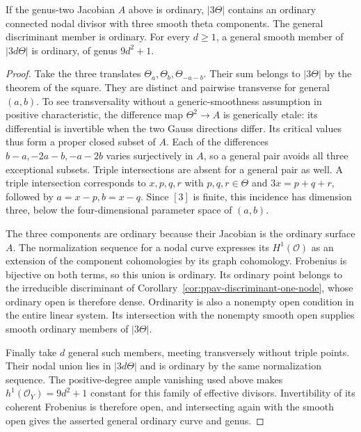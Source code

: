 \begin{lemma}\label{lem:ppav-ordinary-members}
If the genus-two Jacobian $A$ above is ordinary, $|3\Theta|$ contains
an ordinary connected nodal divisor with three smooth theta components.
The general discriminant member is ordinary. For every $d\ge1$, a general
smooth member of $|3d\Theta|$ is ordinary, of genus $9d^2+1$.
\end{lemma}
\begin{proof}
Take the three translates $\Theta_a,\Theta_b,\Theta_{-a-b}$.
Their sum belongs to $|3\Theta|$ by the theorem of the square.
They are distinct and pairwise transverse for general $(a,b)$.
To see transversality without a generic-smoothness assumption in positive
characteristic, the difference map $\Theta^2\to A$ is generically etale:
its differential is invertible when the two Gauss directions differ.
Its critical values thus form a proper closed subset of $A$.
Each of the differences $b-a,-2a-b,-a-2b$ varies surjectively in $A$,
so a general pair avoids all three exceptional subsets.
Triple intersections are absent for a general pair as well. A triple
intersection corresponds to $x,p,q,r$ with $p,q,r\in\Theta$ and
$3x=p+q+r$, followed by $a=x-p,b=x-q$. Since $[3]$ is finite,
this incidence has dimension three, below the four-dimensional
parameter space of $(a,b)$.

The three components are ordinary because their Jacobian is the ordinary
surface $A$. The normalization sequence for a nodal curve expresses its
$H^1(\mathcal O)$ as an extension of the component cohomologies by its
graph cohomology. Frobenius is bijective on both terms, so this union
is ordinary. Its ordinary point belongs to the irreducible discriminant
of Corollary~\ref{cor:ppav-discriminant-one-node}, whose ordinary open
is therefore dense. Ordinarity is also a nonempty open condition in
the entire linear system. Its intersection with the nonempty smooth
open supplies smooth ordinary members of $|3\Theta|$.

Finally take $d$ general such members, meeting transversely without
triple points. Their nodal union lies in $|3d\Theta|$ and is ordinary
by the same normalization sequence. The positive-degree ample vanishing
used above makes $h^1(\mathcal O_Y)=9d^2+1$ constant for this family
of effective divisors. Invertibility of its coherent Frobenius is
therefore open, and intersecting again with the smooth open gives
the asserted general ordinary curve and genus.
\end{proof}

